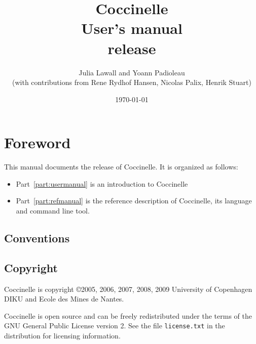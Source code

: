\documentclass{report}
\begin{document}
\date{}

\title{
{\Huge \bf Coccinelle}\\
{User's manual}\\
{release \cocciversion}\\
}

\author{
Julia Lawall and Yoann Padioleau \\
{(with contributions from
Rene Rydhof Hansen,
Nicolas Palix,
Henrik Stuart)
}
}

\date{\today}

\maketitle
\tableofcontents


\chapter*{Foreword}

This manual documents the release \cocciversion of Coccinelle.
It is organized as follows:
\begin{itemize}
  \item Part~\ref{part:usermanual} is an introduction to Coccinelle
  \item Part~\ref{part:refmanual} is the reference description
    of Coccinelle, its language and command line tool.
\end{itemize}

\section*{Conventions}

\section*{Copyright}

Coccinelle is copyright \copyright 2005, 2006, 2007, 2008, 2009
University of Copenhagen DIKU and Ecole des Mines de Nantes.

Coccinelle is open source and can be freely redistributed under the
terms of the GNU General Public License version 2. See the file
\verb+license.txt+ in the distribution for licensing information.
\end{document}
